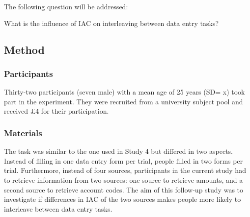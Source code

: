 \begin{table}
\begin{enumerate}
The following question will be addressed:

What is the influence of IAC on interleaving between data entry tasks?

\subsection{Method}
\subsubsection{Participants}
Thirty-two participants (seven male) with a mean age of 25 years (SD= x) took part in the experiment. They were recruited from a university subject pool and received $\pounds$4 for their participation.

\subsubsection{Materials}
The task was similar to the one used in Study 4 but differed in two aspects. Instead of filling in one data entry form per trial, people filled in two forms per trial. Furthermore, instead of four sources, participants in the current study had to retrieve information from two sources: one source to retrieve amounts, and a second source to retrieve account codes. The aim of this follow-up study was to investigate if differences in IAC of the two sources makes people more likely to interleave between data entry tasks.


\end{enumerate}
\end{table}

